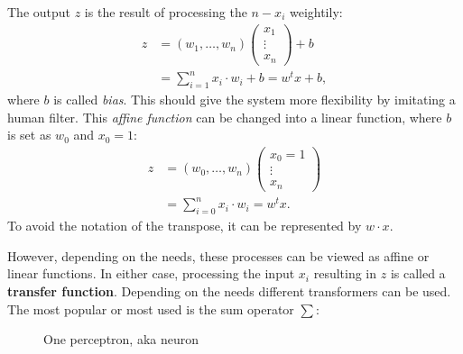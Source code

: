 The output $z$ is the result of processing the $n-x_i$ weightily:
\begin{align}
z &= (w_1, \dots, w_n) \left(\begin{matrix}
		x_1 \\
		\vdots \\
		x_n
	\end{matrix} \right) + b \\
  &= \sum_{i=1}^n x_i\cdot w_i +b = w^t x + b,
\end{align}
where $b$ is called \textit{bias}. This should give the system more flexibility by imitating a human filter. This \textit{affine function} can be changed into a linear function, where $b$ is set as $w_0$ and $x_0 = 1$:
\begin{align}
z &= (w_0, \dots, w_n) \left(\begin{matrix}
		x_0 = 1 \\
		\vdots \\
		x_n
	\end{matrix} \right) \\
  &= \sum_{i=0}^n x_i\cdot w_i = w^t x.
\end{align}
To avoid the notation of the transpose, it can be represented by $w\cdot x$.

However, depending on the needs, these processes can be viewed as affine or linear functions. In either case, processing the input $x_i$ resulting in $z$ is called a \textbf{transfer function}. Depending on the needs different transformers can be used. The most popular or most used is the sum operator $\sum$:

\begin{figure}[h]
\centering
{}
\caption{One perceptron, aka neuron}
\end{figure}

